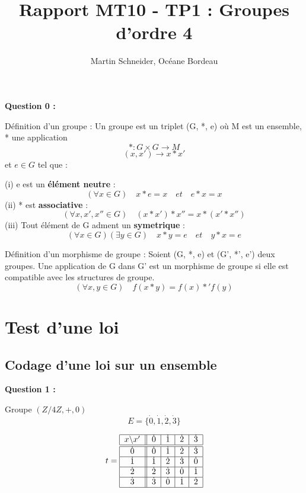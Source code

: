 \documentclass[titlepage]{article}
\title{Rapport MT10 - TP1 : Groupes d’ordre 4}
\author{Martin Schneider, Océane Bordeau}
\begin{document}
    \maketitle
    \textbf{Question 0 :}

    Définition d'un groupe : Un groupe est un triplet (G, *, e) où M est un ensemble, * une application
    \[*:G \times G \longrightarrow M\]
    \[(x, x') \longrightarrow x*x'\]
    et $e \in G$ tel que : 

    (i) e est un \textbf{élément neutre} : \[(\forall x \in G) \quad x*e=x \quad et \quad e*x=x\]
    (ii) * est \textbf{associative} : \[(\forall x, x', x'' \in G) \quad (x*x')*x''=x*(x'*x'')\]
    (iii) Tout élément de G adment un \textbf{symetrique} : \[(\forall x \in G)(\exists y \in G) \quad x*y=e \quad et \quad y*x=e\]

    Définition d'un morphisme de groupe : Soient (G, *, e) et (G', *', e') deux groupes. 
    Une application de G dans G' est un morphisme de groupe si elle est compatible avec les structures de groupe.
    \[(\forall x, y \in G) \quad f(x*y)=f(x)*'f(y)\]

    \section{Test d'une loi}
        \subsection{Codage d'une loi sur un ensemble}
        \textbf{Question 1 :}

        Groupe $(Z/4Z, +, 0)$
        \[E = \{\dot{0}, \dot{1}, \dot{2}, \dot{3}\}\]

        \[t=\begin{tabular}{| c || c | c | c | c |}
            \hline
            $x$\textbackslash $x'$ & $\dot{0}$ & $\dot{1}$ & $\dot{2}$ & $\dot{3}$ \\ \hline \hline
            $\dot{0}$ & $\dot{0}$ & $\dot{1}$ & $\dot{2}$ & $\dot{3}$ \\ \hline
            $\dot{1}$ & $\dot{1}$ & $\dot{2}$ & $\dot{3}$ & $\dot{0}$ \\ \hline
            $\dot{2}$ & $\dot{2}$ & $\dot{3}$ & $\dot{0}$ & $\dot{1}$ \\ \hline
            $\dot{3}$ & $\dot{3}$ & $\dot{0}$ & $\dot{1}$ & $\dot{2}$ \\
            \hline
        \end{tabular}\]
\end{document}
